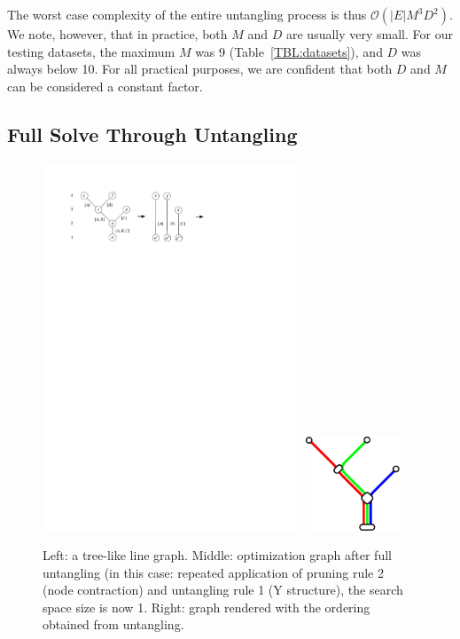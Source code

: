 \documentclass[format=acmsmall, review=false, screen=true]{acmart}
\begin{document}
The worst case complexity of the entire untangling process is thus $\mathcal{O}(|E|M^3D^2)$. We note, however, that in practice, both $M$ and $D$ are usually very small. For our testing datasets, the maximum $M$ was 9 (Table~\ref{TBL:datasets}), and $D$ was always below 10. For all practical purposes, we are confident that both $D$ and $M$ can be considered a constant factor.

\subsection{Full Solve Through Untangling}

\begin{figure}
  \centering
  \includegraphics[width=0.69\textwidth,page=1]{figures/untangling/tree.pdf}
  \includegraphics[width=0.25\textwidth,page=1]{figures/untangling/tree_map.pdf}

  \caption{Left: a tree-like line graph. Middle: optimization graph after full untangling (in this case: repeated application of pruning rule 2 (node contraction) and untangling rule 1 (Y structure), the search space size is now 1. Right: graph rendered with the ordering obtained from untangling.}
  \label{FIG:untangle_tree}
\end{figure}
\end{document}
